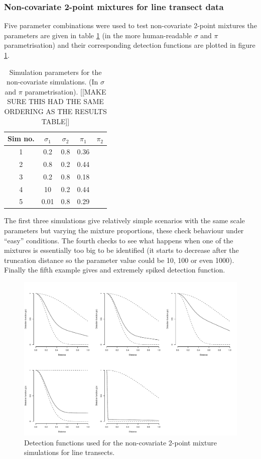 \subsubsection{Non-covariate 2-point mixtures for line transect data}

Five parameter combinations were used to test non-covariate 2-point mixtures the parameters are given in table \ref{mmds-nocov-simtable} (in the more human-readable $\sigma$ and $\pi$ parametrisation) and their corresponding detection functions are plotted in figure \ref{mmds-nocov-funcs}.

\begin{table}[ht]
\centering
\begin{tabular}{c c c c c}
Sim no. & $\sigma_1$ & $\sigma_2$ & $\pi_1$ & $\pi_2$\\
\hline
\hline
1 & 0.2  &  0.8  &  0.36 & \\
2 & 0.8  &  0.2  &  0.44 & \\
3 & 0.2  &  0.8  &  0.18 & \\
4 & 10  &  0.2  &  0.44 & \\
5 & 0.01  &  0.8  &  0.29 & \\
\end{tabular}
\label{mmds-nocov-simtable}
\caption{Simulation parameters for the non-covariate simulations. (In $\sigma$ and $\pi$ parametrisation). [[MAKE SURE THIS HAD THE SAME ORDERING AS THE RESULTS TABLE]]}
\end{table}

The first three simulations give relatively simple scenarios with the same scale parameters but varying the mixture proportions, these check behaviour under ``easy'' conditions. The fourth checks to see what happens when one of the mixtures is essentially too big to be identified (it starts to decrease after the truncation distance so the parameter value could be 10, 100 or even 1000). Finally the fifth example gives and extremely spiked detection function.

\begin{figure}
\centering
\includegraphics[width=6in]{mix/figs/nocovsims.pdf}
\caption{Detection functions used for the non-covariate 2-point mixture simulations for line transects.}
\label{mmds-nocov-funcs}
\end{figure}

